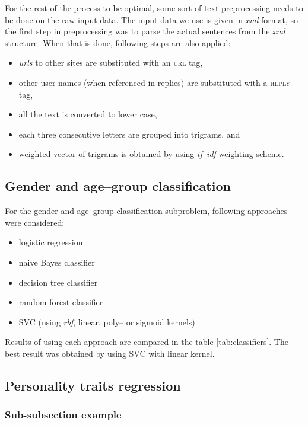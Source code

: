 \documentclass[10pt, a4paper]{article}
\begin{document}
For the rest of the process to be optimal, some sort of text preprocessing needs to be done on the raw input data.
The input data we use is given in \textit{xml} format, so the first step in preprocessing was to parse the actual sentences from the \textit{xml} structure.
When that is done, following steps are also applied:
\begin{itemize}
	\item \textit{urls} to other sites are substituted with an \textsc{url} tag,
	\item other user names (when referenced in replies) are substituted with a \textsc{reply} tag,
	\item all the text is converted to lower case,
	\item each three consecutive letters are grouped into trigrams, and
	\item weighted vector of trigrams is obtained by using \textit{tf--idf} weighting scheme.
\end{itemize}

\subsection{Gender and age--group classification}

For the gender and age--group classification subproblem, following approaches were considered:
\begin{itemize}
	\item logistic regression
	\item naive Bayes classifier
	\item decision tree classifier
	\item random forest classifier
	\item SVC (using \textit{rbf}, linear, poly-- or sigmoid kernels)
\end{itemize}
\noindent Results of using each approach are compared in the table \ref{tab:classifiers}. The best result was obtained by using SVC with linear kernel.

\subsection{Personality traits regression}


\subsubsection{Sub-subsection example} 
\end{document}
